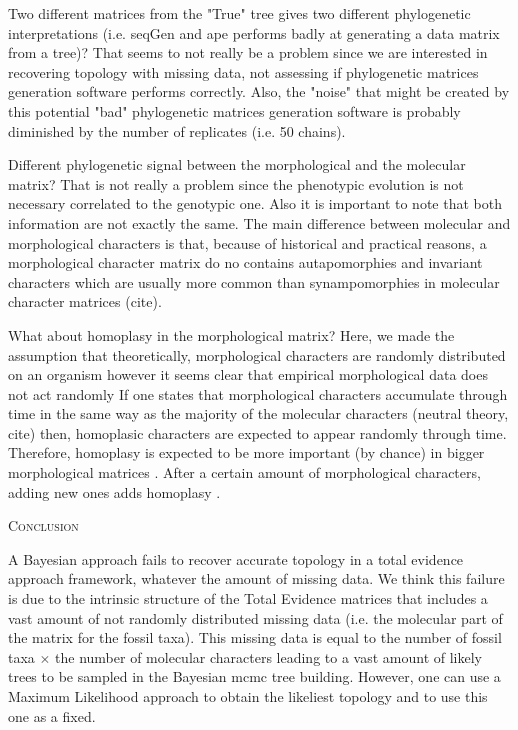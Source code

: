 \documentclass[12pt,letterpaper]{article}
\renewcommand{\section}[1]{%
\bigskip
\begin{center}
\begin{Large}
\normalfont\scshape #1
\medskip
\end{Large}
\end{center}}
\begin{document}
Two different matrices from the "True" tree gives two different phylogenetic interpretations (i.e. seqGen and ape performs badly at generating a data matrix from a tree)?
That seems to not really be a problem since we are interested in recovering topology with missing data, not assessing if phylogenetic matrices generation software performs correctly.
Also, the "noise" that might be created by this potential "bad" phylogenetic matrices generation software is probably diminished by the number of replicates (i.e. 50 chains).

Different phylogenetic signal between the morphological and the molecular matrix?
That is not really a problem since the phenotypic evolution is not necessary correlated to the genotypic one.
Also it is important to note that both information are not exactly the same.
The main difference between molecular and morphological characters is that, because of historical and practical reasons, a morphological character matrix do no contains autapomorphies and invariant characters which are usually more common than synampomorphies in molecular character matrices (cite).

What about homoplasy in the morphological matrix?
Here, we made the assumption that theoretically, morphological characters are randomly distributed on an organism however it seems clear that empirical morphological data does not act randomly
If one states that morphological characters accumulate through time in the same way as the majority of the molecular characters (neutral theory, cite) then, homoplasic characters are expected to appear randomly through time.
Therefore, homoplasy is expected to be more important (by chance) in bigger morphological matrices \citep{davalosintegrating2014}.
After a certain amount of morphological characters, adding new ones adds homoplasy \citep{wagner2000}.

\section{Conclusion}
A Bayesian approach fails to recover accurate topology in a total evidence approach framework, whatever the amount of missing data.
We think this failure is due to the intrinsic structure of the Total Evidence matrices that includes a vast amount of not randomly distributed missing data (i.e. the molecular part of the matrix for the fossil taxa).
This missing data is equal to the number of fossil taxa $\times$ the number of molecular characters leading to a vast amount of likely trees to be sampled in the Bayesian mcmc tree building.
However, one can use a Maximum Likelihood approach to obtain the likeliest topology and to use this one as a fixed.
\end{document}
